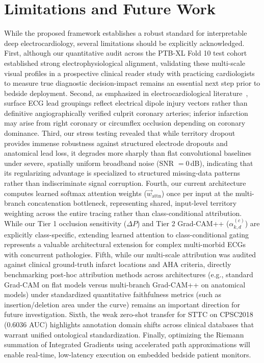 \documentclass[5p,twocolumn,10pt]{elsarticle}
\begin{document}
\section{Limitations and Future Work}
\label{sec:limitations}
While the proposed framework establishes a robust standard for interpretable deep electrocardiology, several limitations should be explicitly acknowledged. First, although our quantitative audit across the PTB-XL Fold 10 test cohort established strong electrophysiological alignment, validating these multi-scale visual profiles in a prospective clinical reader study with practicing cardiologists to measure true diagnostic decision-impact remains an essential next step prior to bedside deployment. Second, as emphasized in electrocardiological literature~\cite{wagner2009aha}, surface ECG lead groupings reflect electrical dipole injury vectors rather than definitive angiographically verified culprit coronary arteries; inferior infarction may arise from right coronary or circumflex occlusion depending on coronary dominance. Third, our stress testing revealed that while territory dropout provides immense robustness against structured electrode dropouts and anatomical lead loss, it degrades more sharply than flat convolutional baselines under severe, spatially uniform broadband noise (SNR $= 0$\,dB), indicating that its regularizing advantage is specialized to structured missing-data patterns rather than indiscriminate signal corruption. Fourth, our current architecture computes learned softmax attention weights ($\vec{w}_{\text{attn}}$) once per input at the multi-branch concatenation bottleneck, representing shared, input-level territory weighting across the entire tracing rather than class-conditional attribution. While our Tier 1 occlusion sensitivity ($\Delta P$) and Tier 2 Grad-CAM++ ($\alpha_{k, d}^{(c)}$) are explicitly class-specific, extending learned attention to class-conditional gating represents a valuable architectural extension for complex multi-morbid ECGs with concurrent pathologies. Fifth, while our multi-scale attribution was audited against clinical ground-truth infarct locations and AHA criteria, directly benchmarking post-hoc attribution methods across architectures (e.g., standard Grad-CAM on flat models versus multi-branch Grad-CAM++ on anatomical models) under standardized quantitative faithfulness metrics (such as insertion/deletion area under the curve) remains an important direction for future investigation. Sixth, the weak zero-shot transfer for STTC on CPSC2018 (0.6036 AUC) highlights annotation domain shifts across clinical databases that warrant unified ontological standardization. Finally, optimizing the Riemann summation of Integrated Gradients using accelerated path approximations will enable real-time, low-latency execution on embedded bedside patient monitors.
\end{document}
